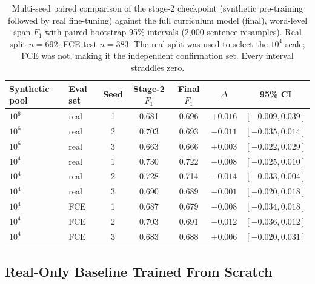 \begin{table}[ht]
\centering
\caption[Multi-seed paired comparison of the stage-2 checkpoint against the full curriculum model.]{Multi-seed paired comparison of the stage-2 checkpoint (synthetic pre-training followed by real fine-tuning) against the full curriculum model (final), word-level span $F_1$ with paired bootstrap 95\% intervals (2{,}000 sentence resamples). Real split $n=692$; FCE test $n=383$. The real split was used to select the $10^4$ scale; FCE was not, making it the independent confirmation set. Every interval straddles zero.}
\label{tab:ling_multiseed}
\begin{tabular}{llccccc}
\toprule
\textbf{Synthetic pool} & \textbf{Eval set} & \textbf{Seed} & \textbf{Stage-2 $F_1$} & \textbf{Final $F_1$} & \textbf{$\Delta$} & \textbf{95\% CI} \\
\midrule
$10^6$ & real & 1 & 0.681 & 0.696 & $+0.016$ & $[-0.009, 0.039]$ \\
$10^6$ & real & 2 & 0.703 & 0.693 & $-0.011$ & $[-0.035, 0.014]$ \\
$10^6$ & real & 3 & 0.663 & 0.666 & $+0.003$ & $[-0.022, 0.029]$ \\
\midrule
$10^4$ & real & 1 & 0.730 & 0.722 & $-0.008$ & $[-0.025, 0.010]$ \\
$10^4$ & real & 2 & 0.728 & 0.714 & $-0.014$ & $[-0.033, 0.004]$ \\
$10^4$ & real & 3 & 0.690 & 0.689 & $-0.001$ & $[-0.020, 0.018]$ \\
\midrule
$10^4$ & FCE  & 1 & 0.687 & 0.679 & $-0.008$ & $[-0.034, 0.018]$ \\
$10^4$ & FCE  & 2 & 0.703 & 0.691 & $-0.012$ & $[-0.036, 0.012]$ \\
$10^4$ & FCE  & 3 & 0.683 & 0.688 & $+0.006$ & $[-0.020, 0.031]$ \\
\bottomrule
\end{tabular}
\end{table}

\subsection{Real-Only Baseline Trained From Scratch}
\label{sec:eval_ling_scratch}

